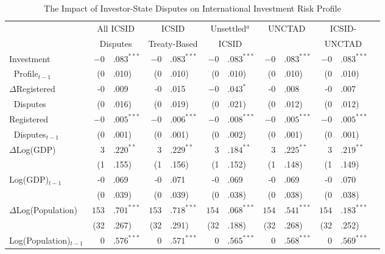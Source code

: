 \documentclass[12pt,onesided]{amsart}
\begin{document}
\begin{table}[ht]
\vspace{1cm}
\centering
{\footnotesize
\caption{The Impact of Investor-State Disputes on International Investment Risk Profile}
\label{tab:ecm}
\begin{tabular}{lr@{} lr@{}lr@{}lr@{}lr@{}lr@{}}
	\hline\hline
	~ & \multicolumn{2}{c}{All ICSID} & \multicolumn{2}{c}{ICSID}  & \multicolumn{2}{c}{Unsettled$^{a}$} & \multicolumn{2}{c}{\multirow{2}{*}{UNCTAD}} & \multicolumn{2}{c}{ICSID-} \\
	~ & \multicolumn{2}{c}{Disputes} & \multicolumn{2}{c}{Treaty-Based} & \multicolumn{2}{c}{ICSID} &  && \multicolumn{2}{c}{UNCTAD}  \\
	\hline
  Investment & $-0$&.$083^{\ast\ast\ast}$ & $-0$&.$083^{\ast\ast\ast}$ & $-0$&.$083^{\ast\ast\ast}$ & $-0$&.$083^{\ast\ast\ast}$ & $-0$&.$083^{\ast\ast\ast}$ \\
  $\;\;$Profile$_{t-1}$ & (0&.010) & (0&.010) & (0&.010) & (0&.010) & (0&.010) \\
  $\Delta$Registered & -0&.009 & -0&.015 & $-0$&.$043^{\ast}$ & -0&.008 & -0&.007 \\
  $\;\;$Disputes & (0&.016) & (0&.019) & (0&.021) & (0&.012) & (0&.012) \\
  Registered & $-0$&.$005^{\ast\ast\ast}$ & $-0$&.$006^{\ast\ast\ast}$ & $-0$&.$008^{\ast\ast\ast}$ & $-0$&.$005^{\ast\ast\ast}$ & $-0$&.$005^{\ast\ast\ast}$ \\
  $\;\;$Disputes$_{t-1}$ & (0&.001) &  (0&.001) & (0&.002) & (0&.001) & (0&.001) \\
  \multirow{2}{*}{$\Delta$Log(GDP)} & $3$&.$220^{\ast\ast}$ & $3$&.$229^{\ast\ast}$ & $3$&.$184^{\ast\ast}$ & $3$&.$225^{\ast\ast}$ & $3$&.$219^{\ast\ast}$ \\
  & (1&.155) & (1&.156) & (1&.152) & (1&.148) & (1&.149) \\
  \multirow{2}{*}{Log(GDP)$_{t-1}$} & -0&.069 & -0&.071 & -0&.069 & -0&.069 & -0&.070\\
  & (0&.039) & (0&.039) & (0&.038) & (0&.038) & (0&.038) \\
  \multirow{2}{*}{$\Delta$Log(Population)} & $153$&.$701^{\ast\ast\ast}$ & $153$&.$718^{\ast\ast\ast}$ & $154$&.$068^{\ast\ast\ast}$ & $154$&.$541^{\ast\ast\ast}$ & $154$&.$183^{\ast\ast\ast}$ \\
  & (32&.267) & (32&.291) & (32&.188) & (32&.268) & (32&.252) \\
  \multirow{2}{*}{Log(Population)$_{t-1}$} & $0$&$.576^{\ast\ast\ast}$ & $0$&$.571^{\ast\ast\ast}$ & $0$&$.565^{\ast\ast\ast}$ & $0$&$.568^{\ast\ast\ast}$ & $0$&$.569^{\ast\ast\ast}$ \\

\end{tabular}}
\end{table}
\end{document}
